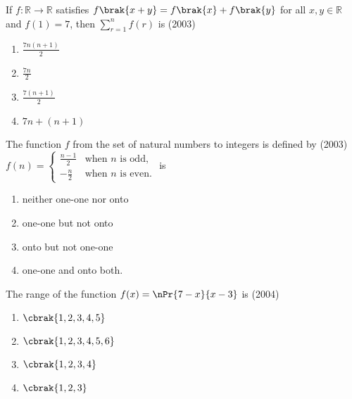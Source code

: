 \iffalse
  \title{Functions}
  \author{EE24BTECH11044:Koushik Muthyala}
  \section{mains}
\fi

 	\item If $f: \mathbb{R} \to \mathbb{R}$ satisfies $f\brak{x+y} = f\brak{x} + f\brak{y}$ for all $x, y \in \mathbb{R}$ and $f(1) = 7$, then $\sum_{r=1}^n f(r)$ is \hfill(2003)
		
    \begin{enumerate}
        \item $\frac{7n(n+1)}{2}$\\
        \item $\frac{7n}{2}$\\
        \item $\frac{7(n+1)}{2}$\\
        \item $7n + (n+1)$
    \end{enumerate}

    \item The function $f$ from the set of natural numbers to integers is defined by \hfill(2003)
               $f(n) = \begin{cases} \frac{n-1}{2} & \text{when } n \text{ is odd}, \\-\frac{n}{2} & \text{when } n \text{ is even}.\end{cases}$ is

	\begin{enumerate}
		\item neither one-one nor onto
		\item one-one but not onto
		\item onto but not one-one
		\item one-one and onto both.
	\end{enumerate} 

\item The range of the function $f(x)=\nPr{7-x}{x-3}$ is \hfill(2004)
	\begin{enumerate}
		\item $\cbrak{1,2,3,4,5}$
		\item $\cbrak{1,2,3,4,5,6}$
		\item $\cbrak{1,2,3,4}$
		\item $\cbrak{1,2,3}$
	\end{enumerate}

